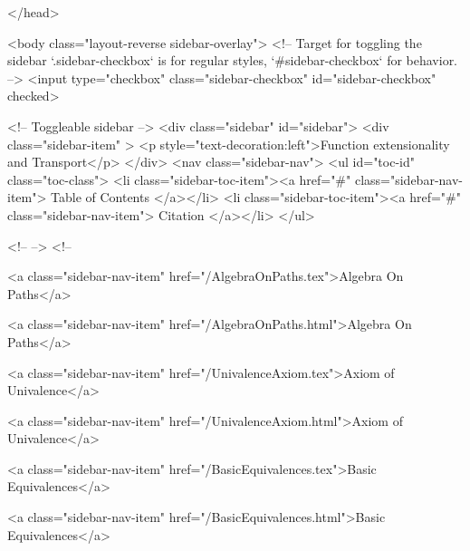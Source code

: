   
</head>




  <body class="layout-reverse sidebar-overlay">
    <!-- Target for toggling the sidebar `.sidebar-checkbox` is for regular
     styles, `#sidebar-checkbox` for behavior. -->
<input type="checkbox" class="sidebar-checkbox" id="sidebar-checkbox" checked>

<!-- Toggleable sidebar -->
<div class="sidebar" id="sidebar">
  <div class="sidebar-item" >
    <p style="text-decoration:left">Function extensionality and Transport</p>
  </div>
  <nav class="sidebar-nav">
    <ul id="toc-id" class="toc-class">
  <li class="sidebar-toc-item"><a href="#" class="sidebar-nav-item"> Table of Contents </a></li>
  <li class="sidebar-toc-item"><a href="#" class="sidebar-nav-item"> Citation </a></li>
</ul>


    <!--  -->
    <!-- 
      
    
      
    
      
    
      
    
      
        
      
    
      
        
          <a class="sidebar-nav-item" href="/AlgebraOnPaths.tex">Algebra On Paths</a>
        
      
    
      
        
          <a class="sidebar-nav-item" href="/AlgebraOnPaths.html">Algebra On Paths</a>
        
      
    
      
        
          <a class="sidebar-nav-item" href="/UnivalenceAxiom.tex">Axiom of Univalence</a>
        
      
    
      
        
          <a class="sidebar-nav-item" href="/UnivalenceAxiom.html">Axiom of Univalence</a>
        
      
    
      
        
          <a class="sidebar-nav-item" href="/BasicEquivalences.tex">Basic Equivalences</a>
        
      
    
      
        
          <a class="sidebar-nav-item" href="/BasicEquivalences.html">Basic Equivalences</a>
        
